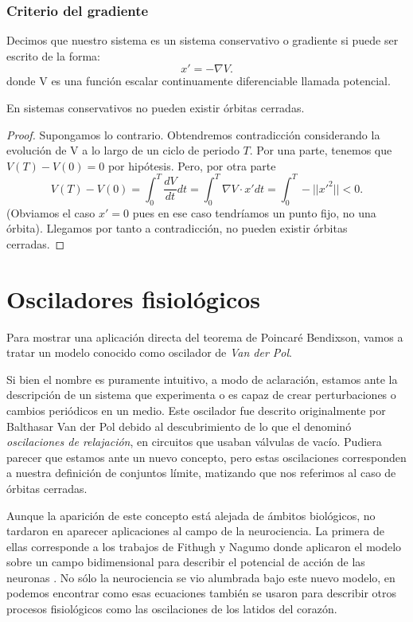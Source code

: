 \subsubsection{Criterio del gradiente}
Decimos que nuestro sistema es un sistema conservativo o gradiente si puede ser escrito de la forma:
\begin{equation}
x'=-\nabla V.
\label{gradiente}
\end{equation}
donde V es una función escalar continuamente diferenciable llamada potencial.
\begin{theorem}
En sistemas conservativos no pueden existir órbitas cerradas.
\end{theorem}
\begin{proof}
	Supongamos lo contrario. Obtendremos contradicción considerando la evolución de V a lo largo de un ciclo de periodo $T$. 
	Por una parte, tenemos que $V(T)-V(0)=0$ por hipótesis. Pero, por otra parte
	\[ V(T)-V(0)=\int_{0}^{T}\frac{dV}{dt}dt=
	\int_{0}^{T}\nabla V\cdot x'dt=
	\int_{0}^{T}-||x'^2||<0. \]
	(Obviamos el caso $x'=0$ pues en ese caso tendríamos un punto fijo, no una órbita). Llegamos por tanto a contradicción, no pueden existir órbitas cerradas.
\end{proof}


\section{Osciladores fisiológicos}
Para mostrar una aplicación directa del teorema de Poincaré Bendixson, vamos a tratar un modelo conocido como oscilador de \textit{ Van der Pol}.

Si bien el nombre es puramente intuitivo, a modo de aclaración, estamos ante la descripción de un sistema que experimenta o es capaz de crear perturbaciones o cambios periódicos en un medio.
Este oscilador fue descrito originalmente por Balthasar Van der Pol \cite{vander} debido al descubrimiento de lo que el denominó \textit{oscilaciones de relajación}, en circuitos que usaban válvulas de vacío. Pudiera parecer que estamos ante un nuevo concepto, pero estas oscilaciones corresponden a nuestra definición de conjuntos límite, matizando que nos referimos al caso de órbitas cerradas.

Aunque la aparición de este concepto está alejada de ámbitos biológicos, no tardaron en aparecer aplicaciones al campo de la neurociencia. La primera de ellas corresponde a los trabajos de Fithugh y Nagumo donde aplicaron el modelo sobre un campo bidimensional para describir el potencial de acción de las neuronas \cite{fit, nagu}. No sólo la neurociencia se vio alumbrada bajo este nuevo modelo, en \cite{mathmobi} podemos encontrar como esas ecuaciones también se usaron para describir otros procesos fisiológicos como las oscilaciones de los latidos del corazón.

